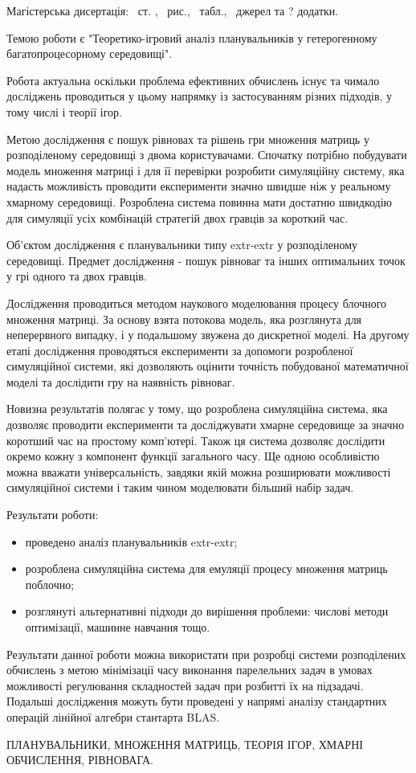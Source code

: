 
Магістерська дисертація: \pageref*{MyLastPage}~ст. , \totfig~рис.,  \tottab~табл., ~джерел та ? додатки.

Темою роботи є "Теоретико-ігровий аналіз планувальників у гетерогенному багатопроцесорному середовищі".

Робота актуальна оскільки проблема ефективних обчислень існує та чимало досліджень проводиться у цьому напрямку із застосуванням різних підходів, у тому числі і теорії ігор.

Метою дослідження є пошук рівновах та рішень гри множення матриць у розподіленому середовищі з двома користувачами. Спочатку потрібно побудувати модель множення матриці і для її перевірки розробити симуляційну систему, яка надасть можливість проводити експерименти значно швидше ніж у реальному хмарному середовищі. Розроблена система повинна мати достатню швидкодію для симуляції усіх комбінацій стратегій двох гравців за короткий час.

Об'єктом дослідження є планувальники типу extr-extr у розподіленому середовищі. Предмет дослідження - пошук рівноваг та інших оптимальних точок у грі одного та двох гравців.

Дослідження проводиться методом наукового моделювання процесу блочного множення матриці. За основу взята потокова модель, яка розглянута для неперервного випадку, і у подальшому звужена до дискретної моделі. На другому етапі дослідження проводяться експерименти за допомоги розробленої симуляційної системи, які дозволяють оцінити точність побудованої математичної моделі та дослідити гру на наявність рівноваг.

Новизна результатів полягає у тому, що розроблена симуляційна система, яка дозволяє проводити експерименти та досліджувати хмарне середовище за значно коротший час на простому комп'ютері. Також ця система дозволяє дослідити окремо кожну з компонент функції загального часу. Ще одною особливістю можна вважати універсальність, завдяки якій можна розширювати можливості симуляційної системи і таким чином моделювати більший набір задач.

Результати роботи:
\begin{itemize}
	\item проведено аналіз планувальників extr-extr;
	\item розроблена симуляційна система для емуляції процесу множення матриць поблочно;
	\item розглянуті альтернативні підходи до вирішення проблеми: числові методи оптимізації, машинне навчання тощо.
\end{itemize}

Результати данної роботи можна використати при розробці системи розподілених обчислень з метою мінімізації часу виконання парелельних задач в умовах можливості регулювання складностей задач при розбитті їх на підзадачі. Подальші дослідження можуть бути проведені у напрямі аналізу стандартних операцій лінійної алгебри стантарта BLAS.

\MakeUppercase{планувальники, множення матриць, теорія ігор, хмарні обчислення, рівновага.}